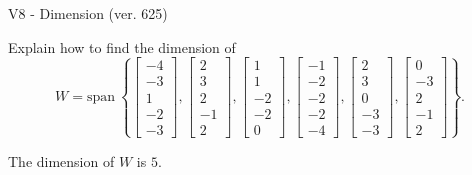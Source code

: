 \begin{exercise}
  \begin{exerciseTitle}V8 - Dimension (ver. 625)\end{exerciseTitle}
  \begin{exerciseStatement}
    Explain how to find the dimension of 
\[W=\mathrm{span}\ \left\{\left[\begin{array}{r}
-4 \\
-3 \\
1 \\
-2 \\
-3
\end{array}\right] , \left[\begin{array}{r}
2 \\
3 \\
2 \\
-1 \\
2
\end{array}\right] , \left[\begin{array}{r}
1 \\
1 \\
-2 \\
-2 \\
0
\end{array}\right] , \left[\begin{array}{r}
-1 \\
-2 \\
-2 \\
-2 \\
-4
\end{array}\right] , \left[\begin{array}{r}
2 \\
3 \\
0 \\
-3 \\
-3
\end{array}\right] , \left[\begin{array}{r}
0 \\
-3 \\
2 \\
-1 \\
2
\end{array}\right]\right\}.\]



  \end{exerciseStatement}
  \begin{exerciseAnswer}
   The dimension of \(W\) is  \(5\).
  


  \end{exerciseAnswer}
\end{exercise}